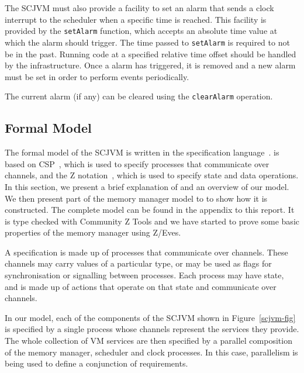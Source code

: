 \documentclass[a4paper,10pt]{article}
\begin{document}
The SCJVM must also provide a facility to set an alarm that sends a clock
interrupt to the scheduler when a specific time is reached. This facility is
provided by the \texttt{set\-Alarm} function, which accepts an absolute time
value at which the alarm should trigger. The time passed to \texttt{set\-Alarm}
is required to not be in the past. Running code at a specified relative time
offset should be handled by the infrastructure. Once a alarm has triggered, it
is removed and a new alarm must be set in order to perform events periodically.

The current alarm (if any) can be cleared using the \texttt{clear\-Alarm}
operation.

\subsection{Formal Model}
\label{formal-model-sec}

The formal model of the SCJVM is written in the \Circus{} specification
language~\cite{oliveira2009}. \Circus{} is based on CSP~\cite{roscoe2011}, which
is used to specify processes that communicate over channels, and the Z
notation~\cite{woodcock1996}, which is used to specify state and data
operations. In this section, we present a brief explanation of \Circus{} and an
overview of our model. We then present part of the memory manager model to to
show how it is constructed. The complete model can be found
in the appendix to this report. It is type checked with Community Z Tools and we have
started to prove some basic properties of the memory manager using Z/Eves.

A \Circus{} specification is made up of processes that communicate over
channels.  These channels may carry values of a particular type, or may be used
as flags for synchronisation or signalling between processes.  Each process may
have state, and is made up of actions that operate on that state and communicate
over channels.

In our model, each of the components of the SCJVM shown in
Figure~\ref{scjvm-fig} is specified by a single process whose channels represent
the services they provide.  The whole collection of VM services are then
specified by a parallel composition of the memory manager, scheduler and clock
processes. In this case, parallelism is being used to define a conjunction of
requirements. 
\end{document}
